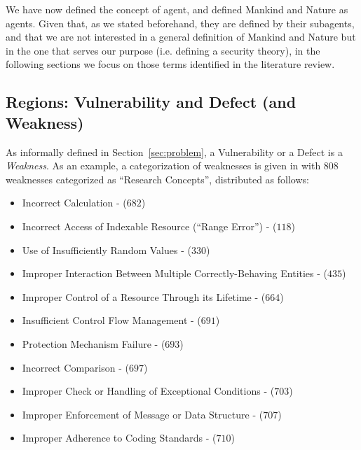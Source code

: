We have now defined the concept of agent, and defined Mankind and Nature as
agents. Given that, as we stated beforehand, they are defined by their
subagents, and that we are not interested in a general definition of Mankind and
Nature but in the one that serves our purpose (i.e. defining a security
theory), in the following sections we focus on those terms identified in the
literature review.

\subsection{Regions: Vulnerability and Defect (and Weakness)}\label{sec:vulnerabilitydefect}
As informally defined in Section~\ref{sec:problem}, a Vulnerability or a Defect is a
\emph{Weakness}.  As an example, a categorization of weaknesses is given
in\autocite{MITRE2020CWEresearch} with 808 weaknesses categorized as ``Research
Concepts'', distributed as follows:
\begin{itemize}[noitemsep]
	\item Incorrect Calculation - ($682$)
	\item Incorrect Access of Indexable Resource (``Range Error'') - ($118$)
	\item Use of Insufficiently Random Values - ($330$)
	\item Improper Interaction Between Multiple Correctly-Behaving Entities - ($435$)
	\item Improper Control of a Resource Through its Lifetime - ($664$)
	\item Insufficient Control Flow Management - ($691$)
	\item Protection Mechanism Failure - ($693$)
	\item Incorrect Comparison - ($697$)
	\item Improper Check or Handling of Exceptional Conditions - ($703$)
	\item Improper Enforcement of Message or Data Structure - ($707$)
	\item Improper Adherence to Coding Standards - ($710$)
\end{itemize}

